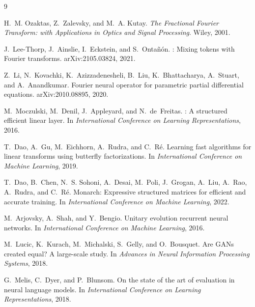 \documentclass{article}
\begin{document}
\begin{thebibliography}{9}

H.~M. Ozaktas, Z.~Zalevsky, and M.~A. Kutay.
\newblock \emph{The Fractional Fourier Transform: with Applications in Optics and Signal Processing}.
\newblock Wiley, 2001.

J.~Lee-Thorp, J.~Ainslie, I.~Eckstein, and S.~Onta\~{n}\'{o}n.
: Mixing tokens with {Fourier} transforms.
\newblock arXiv:2105.03824, 2021.

Z.~Li, N.~Kovachki, K.~Azizzadenesheli, B.~Liu, K.~Bhattacharya, A.~Stuart, and A.~Anandkumar.
\newblock Fourier neural operator for parametric partial differential equations.
\newblock arXiv:2010.08895, 2020.

M.~Moczulski, M.~Denil, J.~Appleyard, and N.~de~Freitas.
: A structured efficient linear layer.
\newblock In \emph{International Conference on Learning Representations}, 2016.

T.~Dao, A.~Gu, M.~Eichhorn, A.~Rudra, and C.~R\'{e}.
\newblock Learning fast algorithms for linear transforms using butterfly factorizations.
\newblock In \emph{International Conference on Machine Learning}, 2019.

T.~Dao, B.~Chen, N.~S. Sohoni, A.~Desai, M.~Poli, J.~Grogan, A.~Liu, A.~Rao, A.~Rudra, and C.~R\'{e}.
\newblock Monarch: Expressive structured matrices for efficient and accurate training.
\newblock In \emph{International Conference on Machine Learning}, 2022.

M.~Arjovsky, A.~Shah, and Y.~Bengio.
\newblock Unitary evolution recurrent neural networks.
\newblock In \emph{International Conference on Machine Learning}, 2016.

M.~Lucic, K.~Kurach, M.~Michalski, S.~Gelly, and O.~Bousquet.
\newblock Are {GANs} created equal? {A} large-scale study.
\newblock In \emph{Advances in Neural Information Processing Systems}, 2018.

G.~Melis, C.~Dyer, and P.~Blunsom.
\newblock On the state of the art of evaluation in neural language models.
\newblock In \emph{International Conference on Learning Representations}, 2018.

\end{thebibliography}
\end{document}
